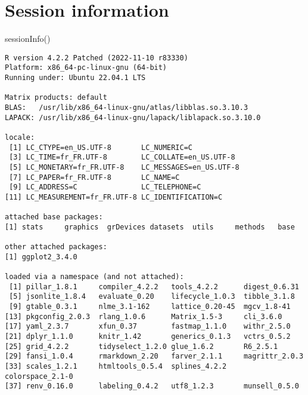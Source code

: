 \documentclass[
  11pt,
  a4paper,
]{article}
\newenvironment{Shaded}{}{}
\newcommand{\FunctionTok}[1]{\textcolor[rgb]{0.44,0.26,0.76}{#1}}
\newcommand{\NormalTok}[1]{\textcolor[rgb]{0.14,0.16,0.18}{#1}}
\theoremstyle{plain}
\theoremstyle{remark}
\begin{document}
\hypertarget{session-information}{%
\section*{Session information}\label{session-information}}

\begin{Shaded}
\begin{Highlighting}[]
\FunctionTok{sessionInfo}\NormalTok{()}
\end{Highlighting}
\end{Shaded}

\begin{tcolorbox}[boxrule=0pt, enhanced, borderline west={2pt}{0pt}{code-block-stdout-light}, interior hidden, frame hidden, breakable, sharp corners, grow to left by=-1em]

\begin{verbatim}
R version 4.2.2 Patched (2022-11-10 r83330)
Platform: x86_64-pc-linux-gnu (64-bit)
Running under: Ubuntu 22.04.1 LTS

Matrix products: default
BLAS:   /usr/lib/x86_64-linux-gnu/atlas/libblas.so.3.10.3
LAPACK: /usr/lib/x86_64-linux-gnu/lapack/liblapack.so.3.10.0

locale:
 [1] LC_CTYPE=en_US.UTF-8       LC_NUMERIC=C              
 [3] LC_TIME=fr_FR.UTF-8        LC_COLLATE=en_US.UTF-8    
 [5] LC_MONETARY=fr_FR.UTF-8    LC_MESSAGES=en_US.UTF-8   
 [7] LC_PAPER=fr_FR.UTF-8       LC_NAME=C                 
 [9] LC_ADDRESS=C               LC_TELEPHONE=C            
[11] LC_MEASUREMENT=fr_FR.UTF-8 LC_IDENTIFICATION=C       

attached base packages:
[1] stats     graphics  grDevices datasets  utils     methods   base     

other attached packages:
[1] ggplot2_3.4.0

loaded via a namespace (and not attached):
 [1] pillar_1.8.1     compiler_4.2.2   tools_4.2.2      digest_0.6.31   
 [5] jsonlite_1.8.4   evaluate_0.20    lifecycle_1.0.3  tibble_3.1.8    
 [9] gtable_0.3.1     nlme_3.1-162     lattice_0.20-45  mgcv_1.8-41     
[13] pkgconfig_2.0.3  rlang_1.0.6      Matrix_1.5-3     cli_3.6.0       
[17] yaml_2.3.7       xfun_0.37        fastmap_1.1.0    withr_2.5.0     
[21] dplyr_1.1.0      knitr_1.42       generics_0.1.3   vctrs_0.5.2     
[25] grid_4.2.2       tidyselect_1.2.0 glue_1.6.2       R6_2.5.1        
[29] fansi_1.0.4      rmarkdown_2.20   farver_2.1.1     magrittr_2.0.3  
[33] scales_1.2.1     htmltools_0.5.4  splines_4.2.2    colorspace_2.1-0
[37] renv_0.16.0      labeling_0.4.2   utf8_1.2.3       munsell_0.5.0   
\end{verbatim}

\end{tcolorbox}
\end{document}
